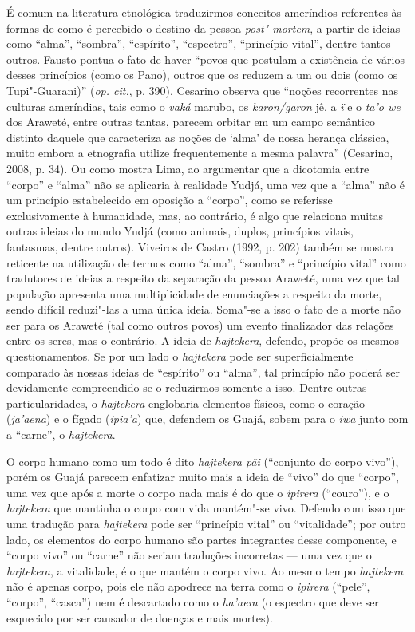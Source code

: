 É comum na literatura etnológica traduzirmos conceitos ameríndios
referentes às formas de como é percebido o destino da pessoa
\emph{post"-mortem}, a partir de ideias como ``alma'', ``sombra'', ``espírito'',
``espectro'', ``princípio vital'', dentre tantos outros. Fausto pontua o
fato de haver ``povos que postulam a existência de vários desses
princípios (como os Pano), outros que os reduzem a um ou dois (como os
Tupi"-Guarani)'' (\emph{op. cit.}, p. 390). Cesarino observa que ``noções
recorrentes nas culturas ameríndias, tais como o \emph{vaká} marubo, os
\emph{karon/garon} jê, a \emph{ï} e o \emph{ta'o we} dos Araweté, entre
outras tantas, parecem orbitar em um campo semântico distinto daquele
que caracteriza as noções de `alma' de nossa herança clássica, muito
embora a etnografia utilize frequentemente a mesma palavra'' (Cesarino,
2008, p. 34). Ou como mostra Lima, ao argumentar que a dicotomia entre
``corpo'' e ``alma'' não se aplicaria à realidade Yudjá, uma vez que a
``alma'' não é um princípio estabelecido em oposição a ``corpo'', como se
referisse exclusivamente à humanidade, mas, ao contrário, é algo que
relaciona muitas outras ideias do mundo Yudjá (como animais, duplos,
princípios vitais, fantasmas, dentre outros). Viveiros de Castro (1992,
p. 202) também se mostra reticente na utilização de termos como ``alma'',
``sombra'' e ``princípio vital'' como tradutores de ideias a respeito da
separação da pessoa Araweté, uma vez que tal população apresenta uma
multiplicidade de enunciações a respeito da morte, sendo difícil
reduzi"-las a uma única ideia. Soma"-se a isso o fato de a morte não ser
para os Araweté (tal como outros povos) um evento finalizador das
relações entre os seres, mas o contrário. A ideia de \emph{hajtekera},
defendo, propõe os mesmos questionamentos. Se por um lado o
\emph{hajtekera} pode ser superficialmente comparado às nossas ideias de
``espírito'' ou ``alma'', tal princípio não poderá ser devidamente
compreendido se o reduzirmos somente a isso. Dentre outras
particularidades, o \emph{hajtekera} englobaria elementos físicos, como
o coração (\emph{ja'aena}) e o fígado (\emph{ipia'a}) que, defendem os
Guajá, sobem para o \emph{iwa} junto com a ``carne'', o \emph{hajtekera}.

O corpo humano como um todo é dito \emph{hajtekera pãi} (``conjunto do
corpo vivo''), porém os Guajá parecem enfatizar muito mais a ideia de
``vivo'' do que ``corpo'', uma vez que após a morte o corpo nada mais é do
que o \emph{ipirera} (``couro''), e o \emph{hajtekera} que mantinha o
corpo com vida mantém"-se vivo. Defendo com isso que uma tradução para
\emph{hajtekera} pode ser ``princípio vital'' ou ``vitalidade''; por outro
lado, os elementos do corpo humano são partes integrantes desse
componente, e ``corpo vivo'' ou ``carne'' não seriam traduções incorretas ---
uma vez que o \emph{hajtekera}, a vitalidade, é o que mantém o corpo
vivo. Ao mesmo tempo \emph{hajtekera} não é apenas corpo, pois ele não
apodrece na terra como o \emph{ipirera} (``pele'', ``corpo'', ``casca'') nem é
descartado como o \emph{ha'aera} (o espectro que deve ser esquecido por
ser causador de doenças e mais mortes).

